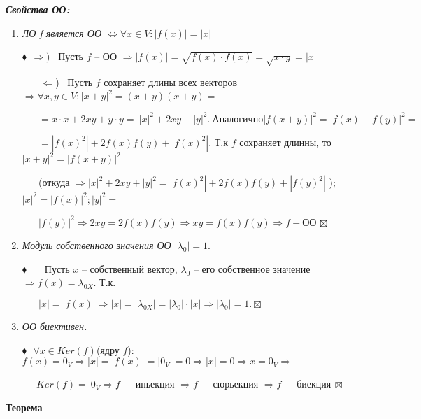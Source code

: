 \documentclass[a4paper, 12pt]{report}
\begin{document}
	\textit{ \textbf{Свойства ОО:}}
	\begin{enumerate}
		\item  \textit{ЛО f является ОО $\Longleftrightarrow  \forall x \in V: |f(x)| = |x|$}
		
		$\blacklozenge \ \ \Rightarrow)$ \ Пусть $f$ -- ОО $\Rightarrow |f(x)| = \sqrt{f(x) \cdot f(x)} = \sqrt{x \cdot y} = |x|$
		
		$\quad$   \ $\Leftarrow$) \ Пусть $f$ сохраняет длины всех векторов $\Rightarrow \forall x,y \in V: |x + y|^2 = (x+y)(x+y)= $ 
		
		$\quad  \ \ \ = x \cdot x + 2xy + y \cdot y =\ |x|^2 + 2xy + |y|^2. \ Аналогично |f(x + y)|^2 = |f(x) + f(y) |^2 = $ 
		
		$\quad  \ \ \ = |f(x)^2|+ 2 f(x)f(y) + |f(x)^2|.$ Т.к $f$ сохраняет длинны, то $|x + y|^2 = |f(x + y)|^2$
		
		$\quad\ \ \ $(откуда $\Rightarrow |x|^2 + 2xy + |y|^2 = |f(x)^2| + 2f(x)f(y) + |f(y)^2|$ ); 
		$|x|^2 = |f(x)|^2; |y|^2 = $
		
		$\quad \ \ \ |f(y)|^2 \Rightarrow 2xy = 2f(x)f(y) \Rightarrow xy = f(x)f(y) \Rightarrow f - $ОО$ $ $ \boxtimes$
		
		
		\item  \textit{Модуль собственного значения ОО $|\lambda_{0}| = 1.$  }
		
		$\blacklozenge$ \ \ \ Пусть $x$ -- собственный вектор, $\lambda_{0}$ -- его собственное значение  $\Rightarrow f(x) = \lambda_{0X} .$ Т.к. 
		
		$\quad \ \ \ |x| = |f(x)| \Rightarrow |x| = |\lambda_{0X}| = |\lambda_{0}| \cdot |x| \Rightarrow |\lambda_{0}| = 1. \boxtimes$
		
		\item  \textit{ ОО биективен.  }
		
		$\blacklozenge \ \ \ \forall x \in Ker(f) $(ядру $f$): $f(x) = 0_{V} \Rightarrow |x| = |f(x)| = |0_{V}| = 0 \Rightarrow |x| = 0 \Rightarrow x= 0_{V} \Rightarrow $
		
		$\quad \ \  Ker(f) = \ { 0_{V} }  \Rightarrow f - $ иньекция $ \Rightarrow f- $ сюрьекция $  \Rightarrow f - $ биекция$ \ \boxtimes$
		
		\par\bigskip
	\end{enumerate}
	
	\textbf{Теорема}
	
\end{document}
